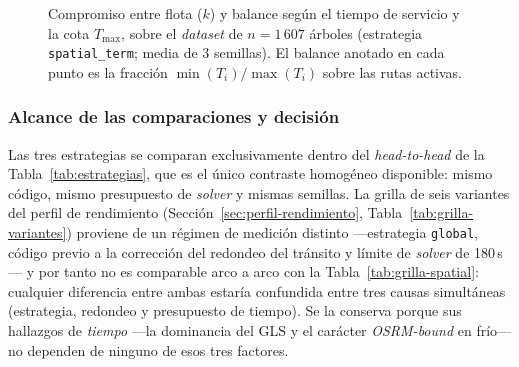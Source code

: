 \begin{figure}[H]
  \centering
  \caption{Compromiso entre flota ($k$) y balance según el tiempo de servicio y la cota $T_{\max}$, sobre el \textit{dataset} de $n=1\,607$ árboles (estrategia \texttt{spatial\_term}; media de 3 semillas). El balance anotado en cada punto es la fracción $\min(T_i)/\max(T_i)$ sobre las rutas activas.}
  \label{fig:grilla-spatial-k}
\end{figure}

\subsubsection*{Alcance de las comparaciones y decisión}

Las tres estrategias se comparan exclusivamente dentro del \textit{head-to-head}
de la Tabla~\ref{tab:estrategias}, que es el único contraste homogéneo
disponible: mismo código, mismo presupuesto de \textit{solver} y mismas semillas. La
grilla de seis variantes del perfil de rendimiento
(Sección~\ref{sec:perfil-rendimiento}, Tabla~\ref{tab:grilla-variantes})
proviene de un régimen de medición
distinto ---estrategia \texttt{global}, código previo a la corrección
del redondeo del tránsito y límite de \textit{solver} de 180\,s--- y por tanto no
es comparable arco a arco con la Tabla~\ref{tab:grilla-spatial}: cualquier
diferencia entre ambas estaría confundida entre tres causas simultáneas
(estrategia, redondeo y presupuesto de tiempo). Se la conserva porque sus
hallazgos de \textit{tiempo} ---la dominancia del GLS y el carácter
\textit{OSRM-bound} en frío--- no dependen de ninguno de esos tres factores.

